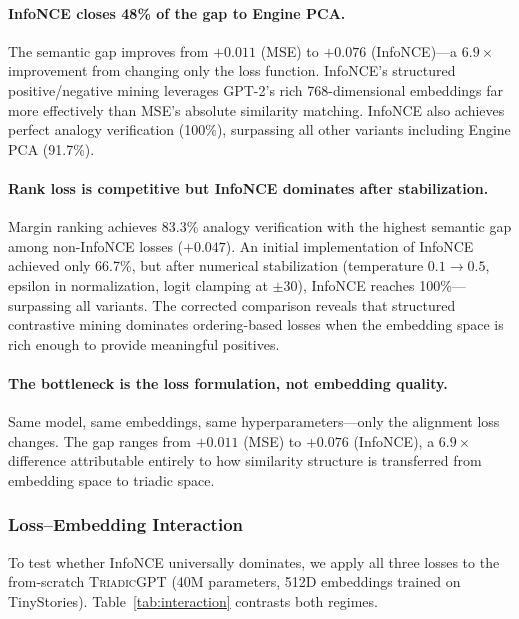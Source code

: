 \documentclass[11pt,a4paper]{article}
\newcommand{\microgpt}{\textsc{TriadicGPT}}
\begin{document}
\paragraph{InfoNCE closes 48\% of the gap to Engine PCA.} The semantic gap improves from $+0.011$ (MSE) to $+0.076$ (InfoNCE)---a $6.9\times$ improvement from changing only the loss function. InfoNCE's structured positive/negative mining leverages GPT-2's rich 768-dimensional embeddings far more effectively than MSE's absolute similarity matching. InfoNCE also achieves perfect analogy verification (100\%), surpassing all other variants including Engine PCA (91.7\%).

\paragraph{Rank loss is competitive but InfoNCE dominates after stabilization.} Margin ranking achieves 83.3\% analogy verification with the highest semantic gap among non-InfoNCE losses ($+0.047$). An initial implementation of InfoNCE achieved only 66.7\%, but after numerical stabilization (temperature $0.1 \to 0.5$, epsilon in normalization, logit clamping at $\pm 30$), InfoNCE reaches 100\%---surpassing all variants. The corrected comparison reveals that structured contrastive mining dominates ordering-based losses when the embedding space is rich enough to provide meaningful positives.

\paragraph{The bottleneck is the loss formulation, not embedding quality.} Same model, same embeddings, same hyperparameters---only the alignment loss changes. The gap ranges from $+0.011$ (MSE) to $+0.076$ (InfoNCE), a $6.9\times$ difference attributable entirely to how similarity structure is transferred from embedding space to triadic space.

\subsubsection{Loss--Embedding Interaction}

To test whether InfoNCE universally dominates, we apply all three losses to the from-scratch \microgpt{} (40M parameters, 512D embeddings trained on TinyStories). Table~\ref{tab:interaction} contrasts both regimes.
\end{document}

